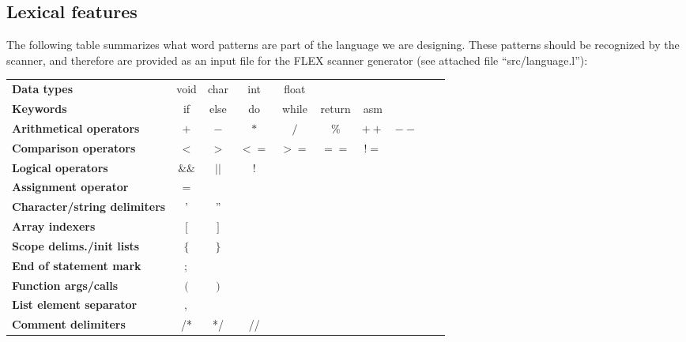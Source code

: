 \subsection{Lexical features}
The following table summarizes what word patterns are part of the language we are designing.
These patterns should be recognized by the scanner, and therefore are provided as an input file
for the FLEX \cite{FLEX} scanner generator (see attached file ``src/language.l''):

\vspace{0.5cm}
{
\small
\begin{tabular}{lccccccccc}
\textbf{Data types}                      & void & char & int & float &         &      &      &   &   \\
\textbf{Keywords}                        & if   & else & do  & while & return  & asm  &      &   &   \\
\textbf{Arithmetical operators}          & $+$  & $-$  & $*$ & $/$   & $\%$    & $++$ & $--$ &   &   \\
\textbf{Comparison operators}            & $<$  & $>$  & $<=$& $>=$  & $==$    & $!=$ &      &   &   \\
\textbf{Logical operators}               &$\&\&$& $||$ & $!$ &       &         &      &      &   &   \\
\textbf{Assignment operator}             & $=$  &      &     &       &         &      &      &   &   \\
\textbf{Character/string delimiters}     &  '   &  ''  &     &       &         &      &      &   &   \\
\textbf{Array indexers}                  & $[$  & $]$  &     &       &         &      &      &   &   \\
\textbf{Scope delims./init lists}        & $\{$ & $\}$ &     &       &         &      &      &   &   \\
\textbf{End of statement mark}           & $;$  &      &     &       &         &      &      &   &   \\
\textbf{Function args/calls}             & $($  & $)$  &     &       &         &      &      &   &   \\
\textbf{List element separator}          & $,$  &      &     &       &         &      &      &   &   \\
\textbf{Comment delimiters}              & /*   & */   & //  &       &         &      &      &   &   \\
\end{tabular}

}
